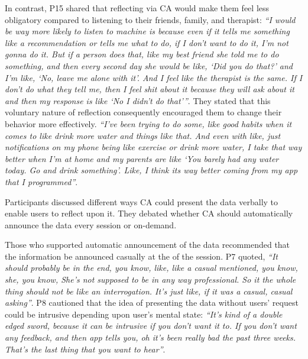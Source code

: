            In contrast, P15 shared that reflecting via \ac{CA} would make them feel less obligatory compared to listening to their friends, family, and therapist:
                \textit{``I would be way more likely to listen to machine is because even if it tells me something like a recommendation or tells me what to do, if I don't want to do it, I'm not gonna do it. But if a person does that, like my best friend she told me to do something, and then every second day she would be like, `Did you do that?' and I'm like, `No, leave me alone with it'. And I feel like the therapist is the same. If I don't do what they tell me, then I feel shit about it because they will ask about it and then my response is like `No I didn't do that'''}.
            They stated that this voluntary nature of reflection consequently encouraged them to change their behavior more effectively.
                \textit{``I've been trying to do some, like good habits when it comes to like drink more water and things like that. And even with like, just notifications on my phone being like exercise or drink more water, I take that way better when I'm at home and my parents are like `You barely had any water today. Go and drink something'. Like, I think its way better coming from my app that I programmed''}.



            Participants discussed different ways \ac{CA} could present the data verbally to enable users to reflect upon it. 
            They debated whether \ac{CA} should automatically announce the data every session or on-demand. 
                
            Those who supported automatic announcement of the data recommended that the information be announced casually at the of the session. P7 quoted,
                \textit{``It should probably be in the end, you know, like, like a casual mentioned, you know, she, you know, She's not supposed to be in any way professional. So it the whole thing should not be like an interrogation. It's just like, if it was a casual, casual asking''}.
            P8 cautioned that the idea of presenting the data without users' request could be intrusive depending upon user's mental state:
                \textit{``It's kind of a double edged sword, because it can be intrusive if you don't want it to. If you don't want any feedback, and then \acl{app} tells you, oh it's been really bad the past three weeks. That's the last thing that you want to hear''}.
        
